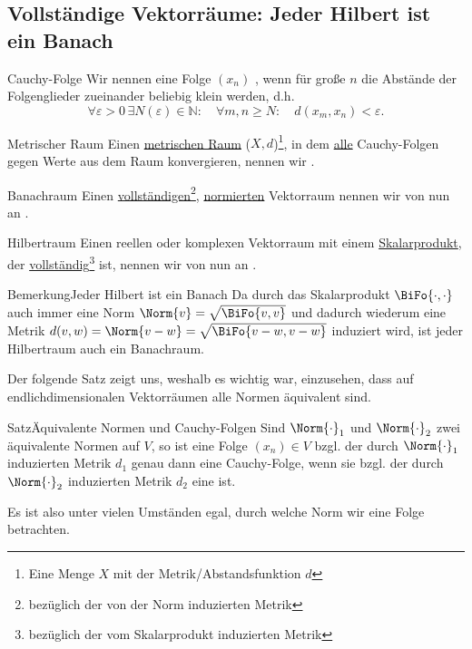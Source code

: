 \subsection{Vollständige Vektorräume: Jeder Hilbert ist ein Banach}
\begin{Wiederholung}{Cauchy-Folge}
Wir nennen eine Folge $(x_n)$ , wenn für große $n$ die Abstände der Folgenglieder zueinander beliebig klein werden, d.h.
\begin{equation}
    \forall\varepsilon>0\,\exists N(\varepsilon)\in\mathbb{N}:\quad \forall m, n \geq N:\quad d(x_m, x_n)<\varepsilon.
\end{equation}
\end{Wiederholung}
\begin{Wiederholung}{Metrischer Raum}
Einen \underline{metrischen Raum} ($X, d$)\footnote{Eine Menge $X$ mit der Metrik/Abstandsfunktion $d$}, in dem \underline{alle} Cauchy-Folgen gegen Werte aus dem Raum konvergieren, nennen wir .
\end{Wiederholung}
\begin{Def}
{Banachraum}
Einen \underline{vollständigen}\footnote{bezüglich der von der Norm induzierten Metrik}, \underline{normierten} Vektorraum nennen wir von nun an .
\end{Def}
\begin{Def}
{Hilbertraum}
Einen reellen oder komplexen Vektorraum mit einem \underline{Skalarprodukt}, der  \underline{vollständig}\footnote{bezüglich der vom Skalarprodukt induzierten Metrik} ist, nennen wir von nun an .
\end{Def}
\begin{Satz}
{Bemerkung}{Jeder Hilbert ist ein Banach}
Da durch das Skalarprodukt $\BiFo{\cdot, \cdot}$ auch immer eine Norm $\Norm{v}=\sqrt{\BiFo{v,v}}$ und dadurch wiederum eine Metrik $d(v,w)=\Norm{v-w}=\sqrt{\BiFo{v-w,v-w}}$ induziert wird, ist jeder Hilbertraum auch ein Banachraum.
\end{Satz}
Der folgende Satz zeigt uns, weshalb es wichtig war, einzusehen, dass auf endlichdimensionalen Vektorräumen alle Normen äquivalent sind.
\begin{Satz}
{Satz}{Äquivalente Normen und Cauchy-Folgen}
Sind $\Norm{\cdot}_1$ und $\Norm{\cdot}_2$ zwei äquivalente Normen auf $V$, so ist eine Folge $(x_n)\in V$ bzgl. der durch $\Norm{\cdot}_1$ induzierten Metrik $d_1$ genau dann eine Cauchy-Folge, wenn sie bzgl. der durch $\Norm{\cdot}_2$ induzierten Metrik $d_2$ eine ist.
\end{Satz}
Es ist also unter vielen Umständen egal, durch welche Norm wir eine Folge betrachten.

